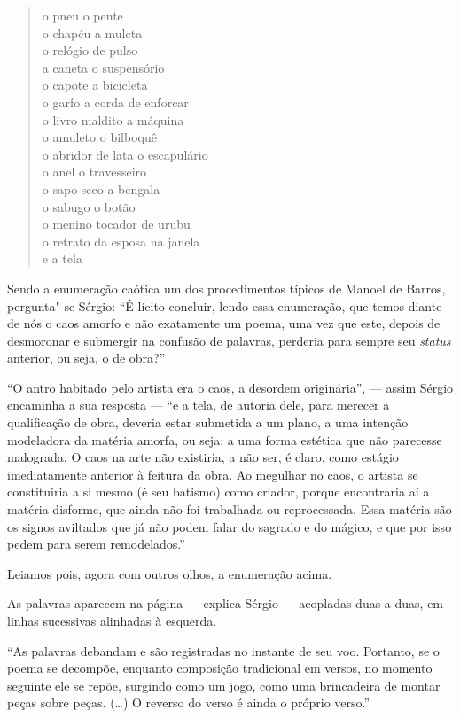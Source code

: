 \begin{verse}
o pneu o pente \\
o chapéu a muleta \\
o relógio de pulso \\
a caneta o suspensório \\
o capote a bicicleta \\
o garfo a corda de enforcar \\
o livro maldito a máquina \\
o amuleto o bilboquê \\
o abridor de lata o escapulário \\
o anel o travesseiro \\
o sapo seco a bengala \\
o sabugo o botão \\
o menino tocador de urubu \\
o retrato da esposa na janela \\
e a tela
\end{verse}

Sendo a enumeração caótica um dos procedimentos típicos de Manoel de
Barros, pergunta"-se Sérgio: ``É lícito concluir, lendo essa enumeração,
que temos diante de nós o caos amorfo e não exatamente um poema, uma vez
que este, depois de desmoronar e submergir na confusão de palavras,
perderia para sempre seu \emph{status} anterior, ou seja, o de
obra?''

``O antro habitado pelo artista era o caos, a desordem originária'', ---
assim Sérgio encaminha a sua resposta --- ``e a tela, de autoria dele,
para merecer a qualificação de obra, deveria estar submetida a um plano,
a uma intenção modeladora da matéria amorfa, ou seja: a uma forma
estética que não parecesse malograda. O caos na arte não existiria, a
não ser, é claro, como estágio imediatamente anterior à feitura da obra.
Ao megulhar no caos, o artista se constituiria a si mesmo (é seu
batismo) como criador, porque encontraria aí a matéria disforme, que
ainda não foi trabalhada ou reprocessada. Essa matéria são os signos
aviltados que já não podem falar do sagrado e do mágico, e que por isso
pedem para serem remodelados.''

Leiamos pois, agora com outros olhos, a enumeração acima.

As palavras aparecem na página --- explica Sérgio --- acopladas duas a duas, em linhas sucessivas alinhadas à
esquerda.

``As palavras debandam e são registradas no instante de seu voo.
Portanto, se o poema se decompõe, enquanto composição tradicional em
versos, no momento seguinte ele se repõe, surgindo como um jogo, como
uma brincadeira de montar peças sobre peças. (\ldots{}) O reverso do verso é
ainda o próprio verso.''

